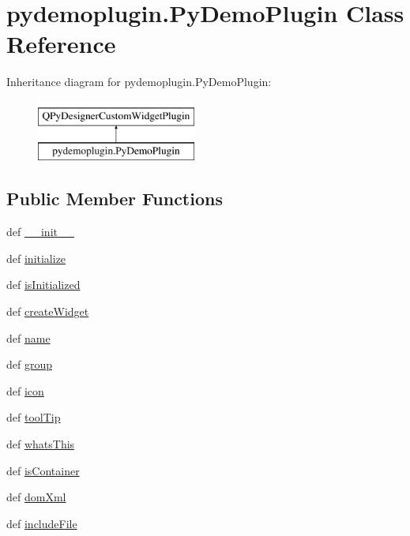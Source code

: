 \hypertarget{classpydemoplugin_1_1PyDemoPlugin}{}\section{pydemoplugin.\+Py\+Demo\+Plugin Class Reference}
\label{classpydemoplugin_1_1PyDemoPlugin}
Inheritance diagram for pydemoplugin.\+Py\+Demo\+Plugin\+:\begin{figure}[H]
\begin{center}
\leavevmode
\includegraphics[height=2.000000cm]{classpydemoplugin_1_1PyDemoPlugin}
\end{center}
\end{figure}
\subsection*{Public Member Functions}
\begin{DoxyCompactItemize}
\item 
def \hyperlink{classpydemoplugin_1_1PyDemoPlugin_a7b1679d8635bcd511d9c4fa15cd8a9cd}{\+\_\+\+\_\+init\+\_\+\+\_\+}
\item 
def \hyperlink{classpydemoplugin_1_1PyDemoPlugin_a30160635436043feb4b1e0096ec66c01}{initialize}
\item 
def \hyperlink{classpydemoplugin_1_1PyDemoPlugin_a01d98e9f6b692df53eb018fab49c8329}{is\+Initialized}
\item 
def \hyperlink{classpydemoplugin_1_1PyDemoPlugin_a05bd6a282b4ed456321331d9302ad2ec}{create\+Widget}
\item 
def \hyperlink{classpydemoplugin_1_1PyDemoPlugin_ac7d7b081c92479f3147f7d745859b585}{name}
\item 
def \hyperlink{classpydemoplugin_1_1PyDemoPlugin_a1d42a0fec3bbf2d039d07add29da9734}{group}
\item 
def \hyperlink{classpydemoplugin_1_1PyDemoPlugin_ae41c8aca923471b7e57b48b48e7a4347}{icon}
\item 
def \hyperlink{classpydemoplugin_1_1PyDemoPlugin_ad5118805f55861b6101feddcc01f679a}{tool\+Tip}
\item 
def \hyperlink{classpydemoplugin_1_1PyDemoPlugin_ab8ef9ac13265d9042202ba4b01ad77d6}{whats\+This}
\item 
def \hyperlink{classpydemoplugin_1_1PyDemoPlugin_a0977df3186469a2c723a1a8dc20b8b2a}{is\+Container}
\item 
def \hyperlink{classpydemoplugin_1_1PyDemoPlugin_ad13cba0c65d22c1267d5a8b38b395638}{dom\+Xml}
\item 
def \hyperlink{classpydemoplugin_1_1PyDemoPlugin_afe9490535931a6270ddd6b8a58a9429b}{include\+File}
\end{DoxyCompactItemize}


